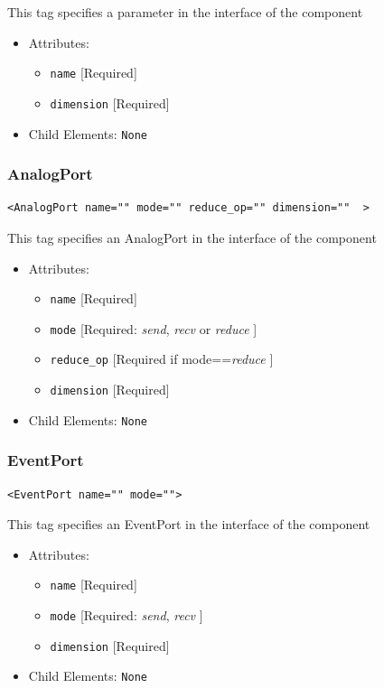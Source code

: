 \documentclass[draftspec]{ninemlspec}
\begin{document}
This tag specifies a parameter in the interface of the component

\begin{itemize}
\item Attributes:
%
\begin{itemize}
\item \verb|name| {[}Required{]}
\item \verb|dimension| {[}Required{]}
\end{itemize}

\item Child Elements: \texttt{None}
\end{itemize}

\subsubsection{AnalogPort}
%
\begin{lstlisting}
<AnalogPort name="" mode="" reduce_op="" dimension=""  >
\end{lstlisting}

This tag specifies an AnalogPort in the interface of the component

\begin{itemize}
\item Attributes:
%
\begin{itemize}
\item \verb|name| {[}Required{]}
\item \verb|mode| {[}Required: \emph{send}, \emph{recv} or \emph{reduce} {]}
\item \verb|reduce_op| {[}Required if mode==\emph{reduce} {]}
\item \verb|dimension| {[}Required{]}
\end{itemize}

\item Child Elements: \texttt{None}
\end{itemize}

\subsubsection{EventPort}
%
\begin{lstlisting}
<EventPort name="" mode="">
\end{lstlisting}

This tag specifies an EventPort in the interface of the component

\begin{itemize}
\item Attributes:
%
\begin{itemize}
\item \verb|name| {[}Required{]}
\item \verb|mode| {[}Required: \emph{send}, \emph{recv} {]}
\item \verb|dimension| {[}Required{]}
\end{itemize}

\item Child Elements: \texttt{None}
\end{itemize}
\end{document}
